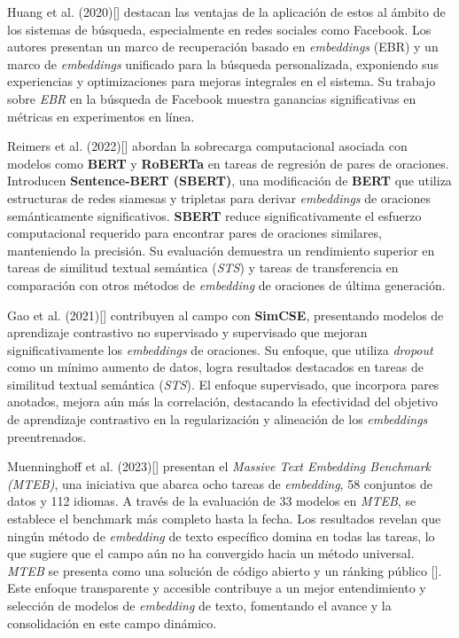     Huang et al. (2020)[\cite{Huang_2020}] destacan las ventajas de la aplicación de estos al ámbito de los sistemas de búsqueda, especialmente en redes sociales como Facebook. Los autores presentan un marco de recuperación basado en \emph{embeddings} (EBR) y un marco de \emph{embeddings} unificado para la búsqueda personalizada, exponiendo sus experiencias y optimizaciones para mejoras integrales en el sistema. Su trabajo sobre \emph{EBR} en la búsqueda de Facebook muestra ganancias significativas en métricas en experimentos en línea.

    Reimers et al. (2022)[\cite{reimers2019sentencebert}] abordan la sobrecarga computacional asociada con modelos como \textbf{BERT} y \textbf{RoBERTa} en tareas de regresión de pares de oraciones. Introducen \textbf{Sentence-BERT (SBERT)}, una modificación de \textbf{BERT} que utiliza estructuras de redes siamesas y tripletas para derivar \emph{embeddings} de oraciones semánticamente significativos. \textbf{SBERT} reduce significativamente el esfuerzo computacional requerido para encontrar pares de oraciones similares, manteniendo la precisión. Su evaluación demuestra un rendimiento superior en tareas de similitud textual semántica (\emph{STS}) y tareas de transferencia en comparación con otros métodos de \emph{embedding} de oraciones de última generación.

    Gao et al. (2021)[\cite{gao2022simcse}] contribuyen al campo con \textbf{SimCSE}, presentando modelos de aprendizaje contrastivo no supervisado y supervisado que mejoran significativamente los \emph{embeddings} de oraciones. Su enfoque, que utiliza \emph{dropout} como un mínimo aumento de datos, logra resultados destacados en tareas de similitud textual semántica (\emph{STS}). El enfoque supervisado, que incorpora pares anotados, mejora aún más la correlación, destacando la efectividad del objetivo de aprendizaje contrastivo en la regularización y alineación de los \emph{embeddings} preentrenados.

    Muenninghoff et al. (2023)[\cite{muennighoff2023mteb}] presentan el \emph{Massive Text Embedding Benchmark (MTEB)}, una iniciativa que abarca ocho tareas de \emph{embedding}, 58 conjuntos de datos y 112 idiomas. A través de la evaluación de 33 modelos en \emph{MTEB}, se establece el benchmark más completo hasta la fecha. Los resultados revelan que ningún método de \emph{embedding} de texto específico domina en todas las tareas, lo que sugiere que el campo aún no ha convergido hacia un método universal. \emph{MTEB} se presenta como una solución de código abierto y un ránking público [\cite{leaderboard}]. Este enfoque transparente y accesible contribuye a un mejor entendimiento y selección de modelos de \emph{embedding} de texto, fomentando el avance y la consolidación en este campo dinámico.

